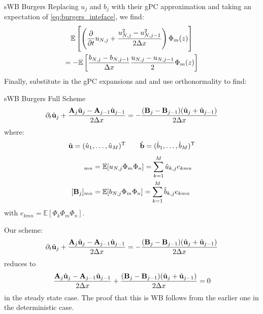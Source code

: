 \documentclass[
    pdf,
    11pt,
    xcolor={svgnames},
  ]{beamer}
\begin{document}
\begin{frame}{sWB Burgers}
    Replacing $u_j$ and $b_j$ with their gPC approximation and taking an expectation of \eqref{eq:burgers_inteface}, we find:
    \begin{multline*}
        \mathbb{E}\left[
            \left(
                \pdv{}{t} u_{N,j} + \frac{u_{N,j}^2-u_{N,j-1}^2}{2\Delta x}
            \right) \Phi_m(z)
        \right] \\
        = -\mathbb{E} \left[
            \frac{b_{N,j} - b_{N,j-1}}{\Delta x} \frac{u_{N,j} - u_{N,j-1}}{2} \Phi_m(z)
        \right]
    \end{multline*}
    \pause
    Finally, substitute in the gPC expansions and and use orthonormality to find:
\end{frame}

\begin{frame}{sWB Burgers Full Scheme}
   \begin{equation}
       \partial_t \hat{\vb{u}}_j + \frac{\vb{A}_j \hat{\vb{u}}_j - \vb{A}_{j-1} \hat{\vb{u}}_{j-1}}{2\Delta x} = -\frac{(\vb{B}_j - \vb{B}_{j-1})(\hat{\vb{u}}_j + \hat{\vb{u}}_{j-1})}{2\Delta x}
   \end{equation} 
   where:
   \begin{equation*}
       \hat{\vb{u}} = (\hat{u}_1, \dots, \hat{u}_M)^\mathrm{T}
       \qquad
       \hat{\vb{b}} = (\hat{b}_1, \dots, \hat{b}_M)^\mathrm{T}
   \end{equation*}
   \begin{align*}
       [\vb{A}_j]_{mn} &= \mathbb{E}[u_{N,j} \Phi_m \Phi_n] = \sum_{k=1}^M \hat{u}_{k,j} e_{kmn} \\
       [\vb{B}_j]_{mn} &= \mathbb{E}[b_{N,j} \Phi_m \Phi_n] = \sum_{k=1}^M \hat{b}_{k,j} e_{kmn}
   \end{align*}
   with $e_{kmn} = \mathbb{E}[\Phi_k \Phi_m \Phi_n]$.
\end{frame}

\begin{frame}
    Our scheme:
   \begin{equation*}
       \partial_t \hat{\vb{u}}_j + \frac{\vb{A}_j \hat{\vb{u}}_j - \vb{A}_{j-1} \hat{\vb{u}}_{j-1}}{2\Delta x} = -\frac{(\vb{B}_j - \vb{B}_{j-1})(\hat{\vb{u}}_j + \hat{\vb{u}}_{j-1})}{2\Delta x}
   \end{equation*} 
   reduces to
   \begin{equation*}
       \frac{\vb{A}_j \hat{\vb{u}}_j - \vb{A}_{j-1} \hat{\vb{u}}_{j-1}}{2\Delta x} + \frac{(\vb{B}_j - \vb{B}_{j-1})(\hat{\vb{u}}_j + \hat{\vb{u}}_{j-1})}{2\Delta x} = 0
   \end{equation*} 
   in the steady state case. The proof that this is WB follows from the earlier one in the deterministic case.
\end{frame}
\end{document}
